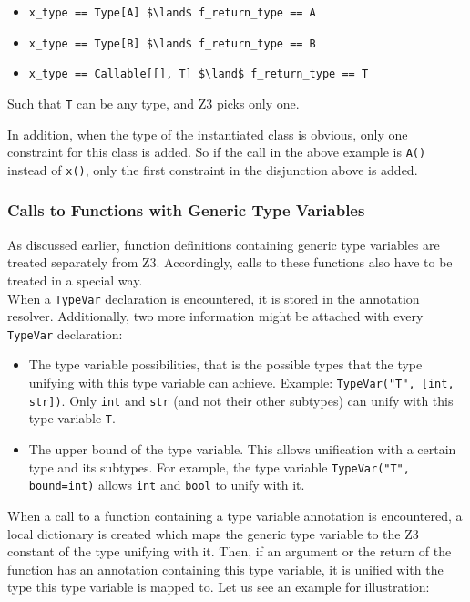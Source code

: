 \begin{itemize}
	\item \lstinline[mathescape]|x_type == Type[A] $\land$ f_return_type == A|
	\item \lstinline[mathescape]|x_type == Type[B] $\land$ f_return_type == B|
	\item \lstinline[mathescape]|x_type == Callable[[], T] $\land$ f_return_type == T|
\end{itemize}
Such that \lstinline|T| can be any type, and Z3 picks only one.

In addition, when the type of the instantiated class is obvious, only one constraint for this class is added. So if the call in the above example is \lstinline|A()| instead of \lstinline|x()|, only the first constraint in the disjunction above is added.

\subsubsection{Calls to Functions with Generic Type Variables}
As discussed earlier, function definitions containing generic type variables are treated separately from Z3. Accordingly, calls to these functions also have to be treated in a special way.\\

When a \lstinline|TypeVar| declaration is encountered, it is stored in the annotation resolver. Additionally, two more information might be attached with every \lstinline|TypeVar| declaration:
\begin{itemize}
	\item The type variable possibilities, that is the possible types that the type unifying with this type variable can achieve. Example: \lstinline|TypeVar("T", [int, str])|. Only \lstinline|int| and \lstinline|str| (and not their other subtypes) can unify with this type variable \lstinline|T|.
	\item The upper bound of the type variable. This allows unification with a certain type and its subtypes. For example, the type variable \lstinline|TypeVar("T", bound=int)| allows \lstinline|int| and \lstinline|bool| to unify with it.
\end{itemize}
When a call to a function containing a type variable annotation is encountered, a local dictionary is created which maps the generic type variable to the Z3 constant of the type unifying with it. Then, if an argument or the return of the function has an annotation containing this type variable, it is unified with the type this type variable is mapped to. Let us see an example for illustration:

